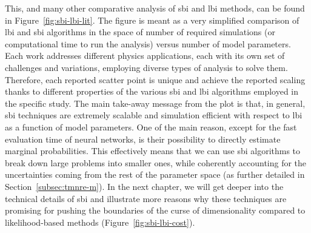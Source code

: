 This, and many other comparative analysis of \gls*{sbi} and \gls*{lbi} methods, can be found in Figure~\ref{fig:sbi-lbi-lit}. The figure is meant as a very simplified comparison of \gls*{lbi} and \gls*{sbi} algorithms in the space of number of required simulations (or computational time to run the analysis) versus number of model parameters. Each work addresses different physics applications, each with its own set of challenges and variations, employing diverse types of analysis to solve them. Therefore, each reported scatter point is unique and achieve the reported scaling thanks to different properties of the various \gls*{sbi} and \gls*{lbi} algorithms employed in the specific study. The main take-away message from the plot is that, in general, \gls*{sbi} techniques are extremely scalable and simulation efficient with respect to \gls*{lbi} as a function of model parameters. One of the main reason, except for the fast evaluation time of neural networks, is their possibility to directly estimate marginal probabilities. This effectively means that we can use \gls*{sbi} algorithms to break down large problems into smaller ones, while coherently accounting for the uncertainties coming from the rest of the parameter space (as further detailed in Section~\ref{subsec:tmnre-m}). In the next chapter, we will get deeper into the technical details of \gls*{sbi} and illustrate more reasons why these techniques are promising for pushing the boundaries of the curse of dimensionality compared to likelihood-based methods (Figure~\ref{fig:sbi-lbi-cost}).


